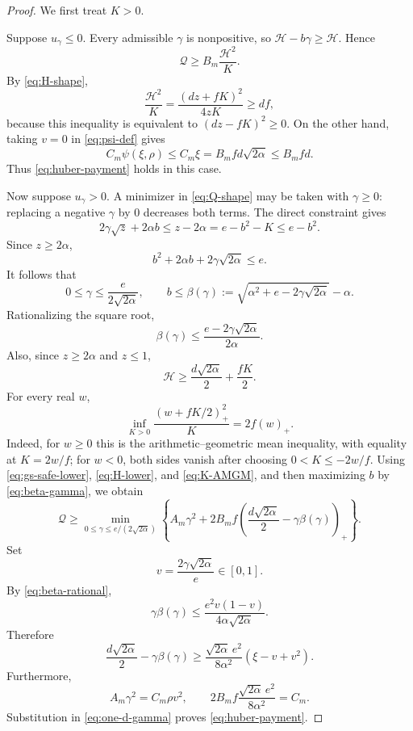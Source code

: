 \documentclass[11pt]{article}
\newcommand{\pos}[1]{\left(#1\right)_{+}}
\newcommand{\cH}{\mathcal H}
\newcommand{\cQ}{\mathcal Q}
\begin{document}
\begin{proof}
We first treat \(K>0\).

Suppose \(u_\gamma\le0\).  Every admissible \(\gamma\) is nonpositive, so
\(\cH-b\gamma\ge\cH\).  Hence
\[
       \cQ\ge B_m\frac{\cH^2}{K}.
\]
By \eqref{eq:H-shape},
\[
 \frac{\cH^2}{K}
 =\frac{(dz+fK)^2}{4zK}\ge df,
\]
because this inequality is equivalent to \((dz-fK)^2\ge0\).  On the other
hand, taking \(v=0\) in \eqref{eq:psi-def} gives
\[
 C_m\psi(\xi,\rho)
 \le C_m\xi=B_mfd\sqrt{2\alpha}\le B_mfd.
\]
Thus \eqref{eq:huber-payment} holds in this case.

Now suppose \(u_\gamma>0\).  A minimizer in \eqref{eq:Q-shape} may be taken
with \(\gamma\ge0\): replacing a negative \(\gamma\) by \(0\) decreases both
terms.  The direct constraint gives
\[
       2\gamma\sqrt z+2\alpha b
       \le z-2\alpha=e-b^2-K\le e-b^2.
\]
Since \(z\ge2\alpha\),
\begin{equation}\label{eq:b-gamma-budget}
       b^2+2\alpha b+2\gamma\sqrt{2\alpha}\le e.
\end{equation}
It follows that
\begin{equation}\label{eq:beta-gamma}
 0\le\gamma\le\frac{e}{2\sqrt{2\alpha}},
 \qquad
 b\le\beta(\gamma):=
 \sqrt{\alpha^2+e-2\gamma\sqrt{2\alpha}}-\alpha.
\end{equation}
Rationalizing the square root,
\begin{equation}\label{eq:beta-rational}
       \beta(\gamma)
       \le\frac{e-2\gamma\sqrt{2\alpha}}{2\alpha}.
\end{equation}
Also, since \(z\ge2\alpha\) and \(z\le1\),
\begin{equation}\label{eq:H-lower}
       \cH\ge\frac{d\sqrt{2\alpha}}2+\frac{fK}{2}.
\end{equation}
For every real \(w\),
\begin{equation}\label{eq:K-AMGM}
       \inf_{K>0}\frac{\pos{w+fK/2}^2}{K}=2f\pos w.
\end{equation}
Indeed, for \(w\ge0\) this is the arithmetic--geometric mean inequality,
with equality at \(K=2w/f\); for \(w<0\), both sides vanish after choosing
\(0<K\le-2w/f\).  Using \eqref{eq:gs-safe-lower},
\eqref{eq:H-lower}, and \eqref{eq:K-AMGM}, and then maximizing \(b\) by
\eqref{eq:beta-gamma}, we obtain
\begin{equation}\label{eq:one-d-gamma}
 \cQ\ge
 \min_{0\le\gamma\le e/(2\sqrt{2\alpha})}
 \left\{
 A_m\gamma^2+2B_mf
 \pos{\frac{d\sqrt{2\alpha}}2-\gamma\beta(\gamma)}
 \right\}.
\end{equation}
Set
\[
       v=\frac{2\gamma\sqrt{2\alpha}}e\in[0,1].
\]
By \eqref{eq:beta-rational},
\[
       \gamma\beta(\gamma)
       \le\frac{e^2v(1-v)}{4\alpha\sqrt{2\alpha}}.
\]
Therefore
\[
 \frac{d\sqrt{2\alpha}}2-\gamma\beta(\gamma)
 \ge\frac{\sqrt{2\alpha}\,e^2}{8\alpha^2}
       (\xi-v+v^2).
\]
Furthermore,
\[
       A_m\gamma^2=C_m\rho v^2,
       \qquad
       2B_mf\frac{\sqrt{2\alpha}\,e^2}{8\alpha^2}=C_m.
\]
Substitution in \eqref{eq:one-d-gamma} proves
\eqref{eq:huber-payment}.


\end{proof}
\end{document}
